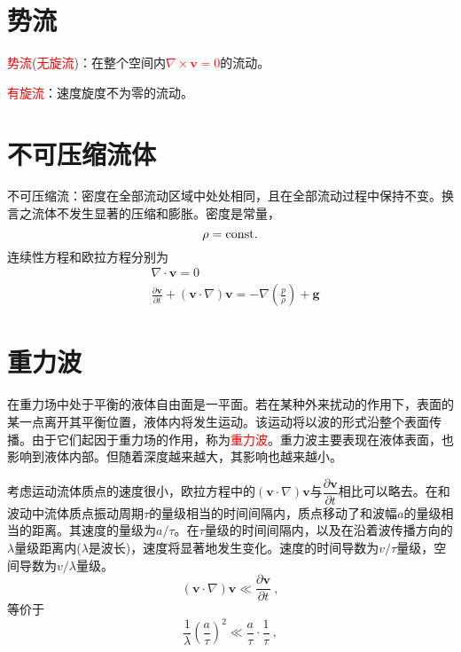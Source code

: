 \documentclass[12pt,a4paper]{article}
\renewcommand{\vec}[1]{\boldsymbol{#1}}
\begin{document}
\section{势流}
\textcolor{red}{势流}(\textcolor{red}{无旋流})：在整个空间内\textcolor{red}{$\nabla \times \vec{v} = 0$}的流动。

\textcolor{red}{有旋流}：速度旋度不为零的流动。














\section{不可压缩流体}
不可压缩流：密度在全部流动区域中处处相同，且在全部流动过程中保持不变。换言之流体不发生显著的压缩和膨胀。密度是常量，
\begin{equation}
\rho = {\rm const}.
\end{equation}
连续性方程和欧拉方程分别为
\begin{align}
& \nabla \cdot \vec{v}  = 0 \\
& \frac{\partial \vec{v}}{\partial t} +(\vec{v} \cdot \nabla)\vec{v} = -\nabla \left(\frac{p}{\rho} \right) +\vec{g} 
\end{align}





\section{重力波}
在重力场中处于平衡的液体自由面是一平面。若在某种外来扰动的作用下，表面的某一点离开其平衡位置，液体内将发生运动。该运动将以波的形式沿整个表面传播。由于它们起因于重力场的作用，称为\textcolor{red}{重力波}。重力波主要表现在液体表面，也影响到液体内部。但随着深度越来越大，其影响也越来越小。

考虑运动流体质点的速度很小，欧拉方程中的$(\vec{v} \cdot \nabla) \vec{v}$与$\dfrac{\partial \vec{v}}{\partial t}$相比可以略去。在和波动中流体质点振动周期$\tau$的量级相当的时间间隔内，质点移动了和波幅$a$的量级相当的距离。其速度的量级为$a/\tau$。在$\tau$量级的时间间隔内，以及在沿着波传播方向的$\lambda$量级距离内($\lambda$是波长)，速度将显著地发生变化。速度的时间导数为$v/\tau$量级，空间导数为$v/\lambda$量级。
\begin{equation*}
(\vec{v} \cdot \nabla) \vec{v} \ll \dfrac{\partial \vec{v}}{\partial t} ~,
\end{equation*}
等价于
\begin{equation*}
 \dfrac{1}{\lambda} \left( \dfrac{a}{\tau} \right)^2 \ll  \dfrac{a}{\tau} \cdot  \dfrac{1}{\tau}~,
\end{equation*}
\end{document}
